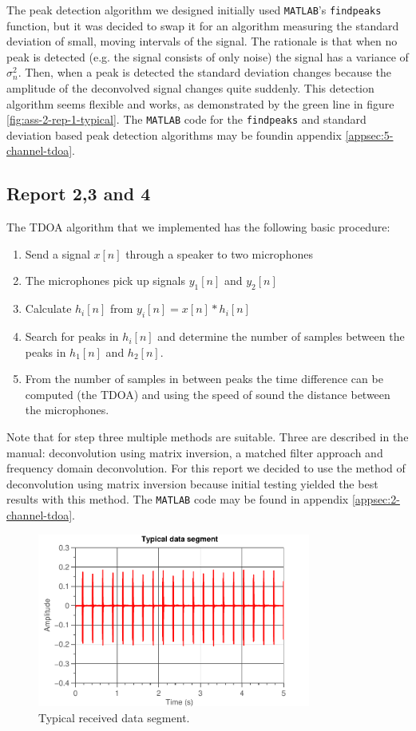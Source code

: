 \documentclass[11pt,titlepage]{report}
\begin{document}
The peak detection algorithm we designed initially used \texttt{MATLAB}'s \texttt{findpeaks} function, but it was decided to swap it for an algorithm measuring the standard deviation of small, moving intervals of the signal. The rationale is that when no peak is detected (e.g. the signal consists of only noise) the signal has a variance of $\sigma_n^2$. Then, when a peak is detected the standard deviation changes because the amplitude of the deconvolved signal changes quite suddenly. This detection algorithm seems flexible and works, as demonstrated by the green line in figure \ref{fig:ass-2-rep-1-typical}. The \texttt{MATLAB} code for the \texttt{findpeaks} and standard deviation based peak detection algorithms may be foundin appendix \ref{appsec:5-channel-tdoa}.

\subsection{Report 2,3 and 4}
The TDOA algorithm that we implemented has the following basic procedure: 
\begin{enumerate}
\item Send a signal $x[n]$ through a speaker to two microphones
\item The microphones pick up signals $y_1[n]$ and $y_2[n]$
\item Calculate $h_i[n]$ from $y_i[n]=x[n]*h_i[n]$ 
\item Search for peaks in $h_i[n]$ and determine the number of samples between the peaks in $h_1[n]$ and $h_2[n]$.
\item From the number of samples in between peaks the time difference can be computed (the TDOA) and using the speed of sound the distance between the microphones.
\end{enumerate}
Note that for step three multiple methods are suitable. Three are described in the manual: deconvolution using matrix inversion, a matched filter approach and frequency domain deconvolution. For this report we decided to use the method of deconvolution using matrix inversion because initial testing yielded the best results with this method. The \texttt{MATLAB} code may be found in appendix \ref{appsec:2-channel-tdoa}.

\begin{figure}[H]
	\centering
	\includegraphics[width=0.8\textwidth]{../../deliverable-7-resources/figures/ass-2/report-2-3/ass-2-report-2-typical-data-segment.pdf}
	\caption{Typical received data segment.}
	\label{fig:ass-2-rep-2-data-segment}
\end{figure}
\end{document}
